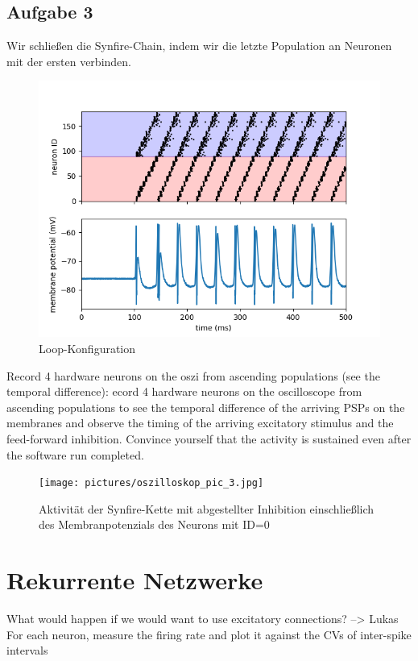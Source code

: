 \documentclass[10pt,a4paper]{scrartcl}
\begin{document}
\subsection{Aufgabe 3}
Wir schließen die Synfire-Chain, indem wir die letzte Population an Neuronen mit der ersten verbinden.
\begin{figure} [ht]
\begin{center}
\label{fig:abb4}
\caption{Loop-Konfiguration}
\includegraphics[scale=0.35]{pictures/synfire_chain_loop.png}
\end{center}
\end{figure}

Record 4 hardware neurons on the oszi from ascending populations (see the temporal difference):
ecord 4 hardware neurons on the oscilloscope from ascending populations to see the
temporal difference of the arriving PSPs on the membranes and observe the timing of
the arriving excitatory stimulus and the feed-forward inhibition. Convince yourself that
the activity is sustained even after the software run completed.


\begin{figure} [ht]
\begin{center}
\label{fig:abb4}
\caption{Aktivität der Synfire-Kette mit abgestellter Inhibition einschließlich des Membranpotenzials des Neurons mit ID=0}
\texttt{[image: pictures/oszilloskop\_pic\_3.jpg]}
\end{center}
\end{figure}

\newpage


\section{Rekurrente Netzwerke}
What would happen if we would want to use excitatory connections? --> Lukas
For each neuron, measure the firing rate and plot it against the
CVs of inter-spike intervals
\end{document}
